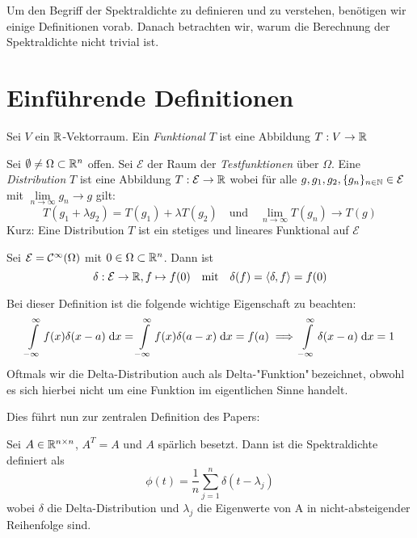 Um den Begriff der Spektraldichte zu definieren und zu verstehen, benötigen wir einige Definitionen vorab.
Danach betrachten wir, warum die Berechnung der Spektraldichte nicht trivial ist.

\section{Einführende Definitionen}

\begin{definition}[Funktional]
    Sei $V$ ein $\mathbb{R}$-Vektorraum. Ein \emph{Funktional} $T$ ist eine Abbildung $T: V \to \mathbb{R}$
\end{definition}

\begin{definition}[Distribution] \label{def:Distribution}
    Sei $\emptyset \neq \Omega \subset \mathbb{R}^n$ offen.
    Sei $\mathcal{E}$ der Raum der \emph{Testfunktionen} über $\Omega$.
    Eine \emph{Distribution} $T$ ist eine Abbildung $T: \mathcal{E} \to \mathbb{R}$ wobei für alle
    $g, g_1, g_2, \{g_n\}_{n \in \mathbb{N}} \in \mathcal{E}$
    mit $\lim\limits_{n \to \infty} g_n \to g$ gilt:
    $$T(g_1 + \lambda g_2) = T(g_1) + \lambda T(g_2) \quad \text{und}\quad \lim\limits_{n \to \infty} T(g_n) \to T(g)$$
    Kurz: Eine Distribution $T$ ist ein stetiges und lineares Funktional auf $\mathcal{E}$
\end{definition}

\begin{definition}
    Sei $\mathcal{E} = \mathcal{C}^{\infty}(\Omega)$ mit $0 \in \Omega \subset \mathbb{R}^n$.
    Dann ist
    $$\delta: \mathcal{E} \to \mathbb{R}, f \mapsto f(0) \quad \text{mit} \quad \delta(f) = \langle \delta, f \rangle = f(0)$$
\end{definition}

Bei dieser Definition ist die folgende wichtige Eigenschaft zu beachten:
$$\int\limits_{-\infty}^{\infty} f(x) \delta(x-a) \;\mathrm{d}x = \int\limits_{-\infty}^{\infty} f(x) \delta(a-x) \;\mathrm{d}x = f(a) \implies \int\limits_{-\infty}^{\infty} \delta(x-a) \;\mathrm{d}x = 1$$
Oftmals wir die Delta-Distribution auch als Delta-"Funktion"\,bezeichnet, obwohl es sich hierbei nicht um eine Funktion im eigentlichen Sinne handelt.

Dies führt nun zur zentralen Definition des Papers:
\begin{definition} [Spektraldichte]
    Sei $A \in \mathbb{R}^{n \times n}$, $A^T = A$ und $A$ spärlich besetzt.
    Dann ist die Spektraldichte definiert als 
    $$\phi(t) = \frac{1}{n} \sum_{j=1}^{n} \delta(t - \lambda_j)$$
    wobei $\delta$ die Delta-Distribution und $\lambda_j$ die Eigenwerte von A in nicht-absteigender Reihenfolge sind.
\end{definition}

